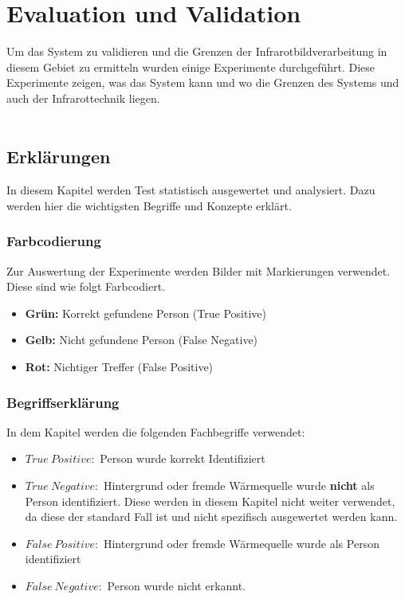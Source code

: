 \chapter{Evaluation und Validation}
\label{ch:Eval}

Um das System zu validieren und die Grenzen der Infrarotbildverarbeitung in diesem Gebiet zu ermitteln wurden einige Experimente durchgeführt. Diese Experimente zeigen, was das System kann und wo die Grenzen des Systems und auch der Infrarottechnik liegen.\\
\\
\section{Erklärungen}
In diesem Kapitel werden Test statistisch ausgewertet und analysiert. Dazu werden hier die wichtigsten Begriffe und Konzepte erklärt.

\subsection{Farbcodierung}
Zur Auswertung der Experimente werden Bilder mit Markierungen verwendet. Diese sind wie folgt Farbcodiert.\\

\begin{itemize}
	\item \textbf{Grün:} Korrekt gefundene Person (True Positive)
	\item \textbf{Gelb:} Nicht gefundene Person (False Negative)
	\item \textbf{Rot:} Nichtiger Treffer (False Positive)
\end{itemize}
\vspace{1em}

\subsection{Begriffserklärung}
\noindent In dem Kapitel werden die folgenden Fachbegriffe verwendet:
\begin{itemize}
	\item $True\: Positive:$   Person wurde korrekt Identifiziert
	\item $True\: Negative:$   Hintergrund oder fremde Wärmequelle wurde \textbf{nicht} als Person identifiziert. Diese werden in diesem Kapitel nicht weiter verwendet, da diese der standard Fall ist und nicht spezifisch ausgewertet werden kann.
	\item $False\: Positive:$  Hintergrund oder fremde Wärmequelle wurde als Person identifiziert
	\item $False\: Negative:$  Person wurde nicht erkannt.
\end{itemize}
\vspace{1em}

